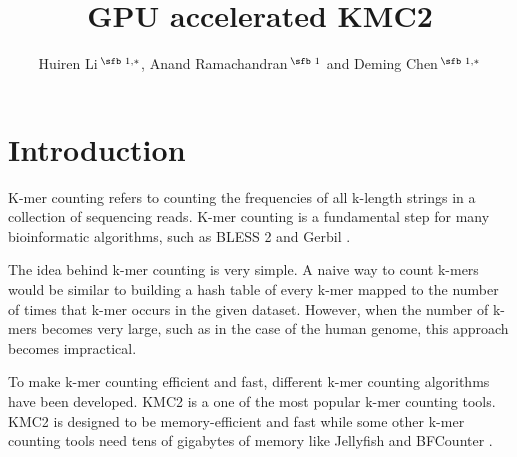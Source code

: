 \documentclass{bioinfo}
\begin{document}

\title[short Title]{GPU accelerated KMC2}
\author[]{Huiren Li\,$^{\text{\sfb 1,}*}$, Anand Ramachandran\,$^{\text{\sfb 1}}$ and
Deming Chen\,$^{\text{\sfb 1,}*}$}
\address{$^{\text{\sf 1}}$Department of Electrical and Computer Engineering, University of
Illinois at Urbana-Champaign, Urbana, IL 61801, USA}

\corresp{}




\maketitle

\section{Introduction}

K-mer counting refers to counting the frequencies of all k-length strings in a collection
of sequencing reads.
K-mer counting is a fundamental step for many bioinformatic algorithms, such as BLESS 2
\citep{Heo16} and Gerbil \citep{Mar17}.

The idea behind k-mer counting is very simple. A naive way to count k-mers would be similar 
to building a hash table of every k-mer mapped to the number of times that k-mer occurs 
in the given dataset. However, when the number of k-mers becomes very large, such as in 
the case of the human genome, this approach becomes impractical.

To make k-mer counting efficient and fast, different k-mer counting algorithms have been developed.
KMC2 \citep{Seb14} is a one of the most popular k-mer counting tools. KMC2 is designed to
be memory-efficient and fast while some other k-mer counting tools need tens of
gigabytes of memory like Jellyfish \citep{Mar11} and BFCounter \citep{Mel11}.
\end{document}
